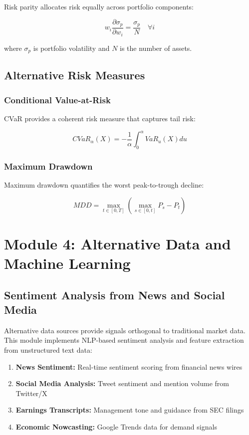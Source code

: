 \documentclass[12pt,a4paper]{article}
\begin{document}
Risk parity allocates risk equally across portfolio components:

\begin{equation}
w_i \frac{\partial \sigma_p}{\partial w_i} = \frac{\sigma_p}{N} \quad \forall i
\end{equation}

where $\sigma_p$ is portfolio volatility and $N$ is the number of assets.

\subsection{Alternative Risk Measures}

\subsubsection{Conditional Value-at-Risk}

CVaR provides a coherent risk measure that captures tail risk:

\begin{equation}
CVaR_\alpha(X) = -\frac{1}{\alpha}\int_0^\alpha VaR_u(X) du
\end{equation}

\subsubsection{Maximum Drawdown}

Maximum drawdown quantifies the worst peak-to-trough decline:

\begin{equation}
MDD = \max_{t \in [0,T]} \left( \max_{s \in [0,t]} P_s - P_t \right)
\end{equation}

\section{Module 4: Alternative Data and Machine Learning}

\subsection{Sentiment Analysis from News and Social Media}

Alternative data sources provide signals orthogonal to traditional market data. This module implements NLP-based sentiment analysis and feature extraction from unstructured text data:

\begin{enumerate}
    \item \textbf{News Sentiment:} Real-time sentiment scoring from financial news wires
    \item \textbf{Social Media Analysis:} Tweet sentiment and mention volume from Twitter/X
    \item \textbf{Earnings Transcripts:} Management tone and guidance from SEC filings
    \item \textbf{Economic Nowcasting:} Google Trends data for demand signals
\end{enumerate}
\end{document}
